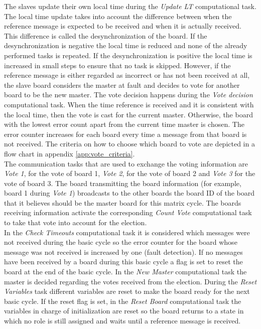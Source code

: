 \documentclass[table,xcdraw]{article}
\begin{document}
The slaves update their own local time during the \textit{Update LT} computational task. The local time update takes into account the difference between when the reference message is expected to be received and when it is actually received. This difference is called the desynchronization of the board. If the desynchronization is negative the local time is reduced and none of the already performed tasks is repeated. If the desynchronization is positive the local time is increased in small steps to ensure that no task is skipped. However, if the reference message is either regarded as incorrect or has not been received at all, the slave board considers the master at fault and decides to vote for another board to be the new master. The vote decision happens during the \textit{Vote decision} computational task. When the time reference is received and it is consistent with the local time, then the vote is cast for the current master. Otherwise, the board with the lowest error count apart from the current time master is chosen. The error counter increases for each board every time a message from that board is not received. The criteria on how to choose which board to vote are depicted in a flow chart in appendix \ref{app:vote_criteria}.\\

The communication tasks that are used to exchange the voting information are \textit{Vote 1}, for the vote of board 1, \textit{Vote 2}, for the vote of board 2 and \textit{Vote 3} for the vote of board 3. The board transmitting the board information (for example, board 1 during \textit{Vote 1}) broadcasts to the other boards the board ID of the board that it believes should be the master board for this matrix cycle. The boards receiving information activate the corresponding \textit{Count Vote} computational task to take that vote into account for the election.\\

In the \textit{Check Timeouts} computational task it is considered which messages were not received during the basic cycle so the error counter for the board whose message was not received is increased by one (fault detection). If no messages have been received by a board during this basic cycle a flag is set to reset the board at the end of the basic cycle. In the \textit{New Master} computational task the master is decided regarding the votes received from the election. During the \textit{Reset Variables} task different variables are reset to make the board ready for the next basic cycle. If the reset flag is set, in the \textit{Reset Board} computational task the variables in charge of initialization are reset so the board returns to a state in which no role is still assigned and waits until a reference message is received.\\
\end{document}
